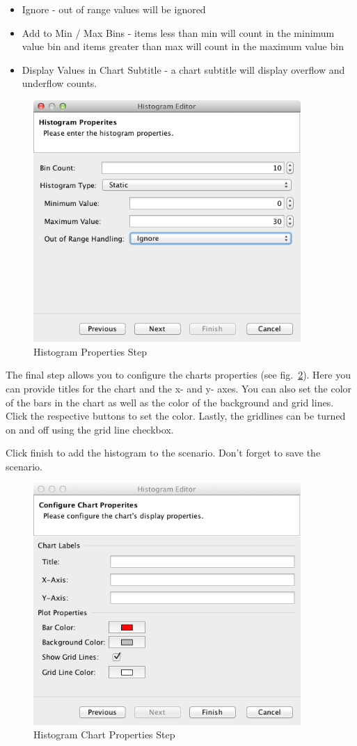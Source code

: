 \documentclass[11pt]{amsart}
\begin{document}
\begin{itemize}
\item Ignore - out of range values will be ignored
\item Add to Min / Max Bins - items less than min will count in the minimum value bin and items greater than max will count in the maximum value bin
\item Display Values in Chart Subtitle - a chart subtitle will display overflow and underflow counts.
\end{itemize}

\begin{figure}[h]
\begin{center}
\vspace{.2in}
\centerline {
\includegraphics[width=4in]{images/h2.png}
}
\caption{Histogram Properties Step}
\label{fig:h2}
\end{center}
\end{figure}

The final step allows you to configure the charts properties (see fig.~\ref{fig:h3}). Here you can provide titles for the chart and the x- and y- axes. You can also set the color of the bars in the chart as well as the color of the background and grid lines. Click the respective buttons to set the color. Lastly, the gridlines can be turned on and off using the grid line checkbox.

Click finish to add the histogram to the scenario. Don't forget to save the scenario.


\begin{figure}[h]
\begin{center}
\vspace{.2in}
\centerline {
\includegraphics[width=4in]{images/h3.png}
}
\caption{Histogram Chart Properties Step}
\label{fig:h3}
\end{center}
\end{figure}
\end{document}
